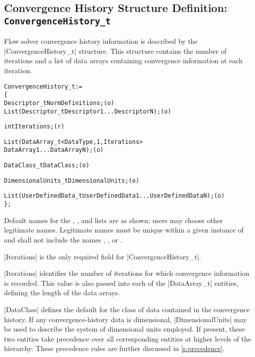 \subsection{Convergence History Structure Definition: \texttt{ConvergenceHistory\_t}}
\label{s:ConvergenceHistory}

Flow solver convergence history information is described by the 
|ConvergenceHistory_t| structure.
This structure contains the number of iterations and a list of data
arrays containing convergence information at each iteration.

\begin{alltt}
  ConvergenceHistory\_t :=
    \{
    Descriptor\_t NormDefinitions ;                                          (o)
    List( Descriptor\_t Descriptor1 ... DescriptorN ) ;                      (o)

    int Iterations ;                                                        (r)

    List( DataArray\_t<DataType, 1, Iterations> 
      DataArray1 ... DataArrayN ) ;                                         (o)

    DataClass\_t DataClass ;                                                 (o)
                
    DimensionalUnits\_t DimensionalUnits ;                                   (o)

    List( UserDefinedData\_t UserDefinedData1 ... UserDefinedDataN ) ;       (o)
    \} ;
\end{alltt}

\begin{notes}
\item
 Default names for the , , and
 lists are as shown; users may choose other legitimate names.
 Legitimate names must be unique within a given instance of
  and shall not include the names
 , , or . 
\item
 |Iterations| is the only required field for |ConvergenceHistory_t|.
\end{notes}

|Iterations| identifies the number of iterations for which convergence
information is recorded.  This value is also passed into each of the
|DataArray_t| entities, defining the length of the data arrays.

|DataClass| defines the default for the class of data contained in the
convergence history.
If any convergence-history data is dimensional, |DimensionalUnits| may
be used to describe the system of dimensional units employed.
If present, these two entities take precedence over all corresponding
entities at higher levels of the hierarchy.
These precedence rules are further discussed in \autoref{s:precedence}.

